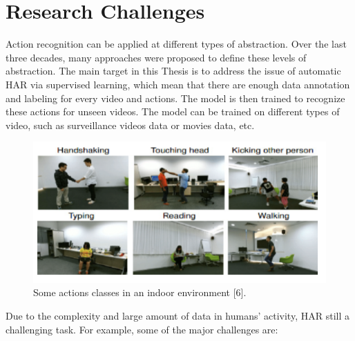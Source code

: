 \section{Research Challenges}
\hspace{5mm} Action recognition can be applied at different types of abstraction. Over the last three decades, many approaches were proposed to define these levels of abstraction. The main target in this Thesis is to address the issue of automatic HAR via supervised learning, which mean that there are enough data annotation and labeling for every video and actions. The model is then trained to recognize these actions for unseen videos. The model can be trained on different types of video, such as surveillance videos data or movies data, etc.
\begin{figure}[ht]
\centering
\includegraphics{Figures/ti.PNG}
\decoRule
\caption[Some actions classes in an indoor environment "6"]{Some actions classes in an indoor environment [6].}
\label{fig:la}
\end{figure}
Due to the complexity and large amount of data in humans’ activity, HAR still a challenging task. For example, some of the major challenges are:
